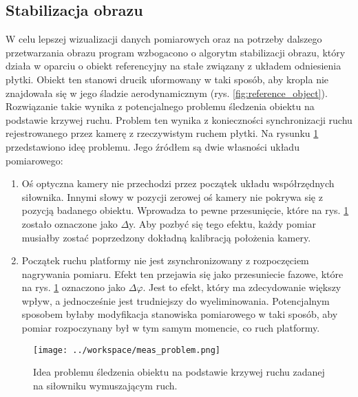 \documentclass[a4paper,11pt,twoside,openright]{article} %
\begin{document}
\vspace{10mm}
\subsection{Stabilizacja obrazu}
\noindent W celu lepszej wizualizacji danych pomiarowych oraz na potrzeby dalszego przetwarzania obrazu program wzbogacono o algorytm stabilizacji obrazu, który działa w oparciu o obiekt referencyjny na stałe związany z układem odniesienia płytki. Obiekt ten stanowi drucik uformowany w taki sposób, aby kropla nie znajdowała się w jego śladzie aerodynamicznym (rys. \ref{fig:reference_object}). Rozwiązanie takie wynika z potencjalnego problemu śledzenia obiektu na podstawie krzywej ruchu. Problem ten wynika z konieczności synchronizacji ruchu rejestrowanego przez kamerę z rzeczywistym ruchem płytki. Na rysunku \ref{fig:meas_problem} przedstawiono ideę problemu. Jego źródłem są dwie własności układu pomiarowego:
\begin{enumerate}
	\item Oś optyczna kamery nie przechodzi przez początek układu współrzędnych siłownika. Innymi słowy w pozycji zerowej oś kamery nie pokrywa się z pozycją badanego obiektu. Wprowadza to pewne przesunięcie, które na rys. \ref{fig:meas_problem} zostało oznaczone jako $\Delta$y. Aby pozbyć się tego efektu, każdy pomiar musiałby zostać poprzedzony dokładną kalibracją położenia kamery.
	\item Początek ruchu platformy nie jest zsynchronizowany z rozpoczęciem nagrywania pomiaru. Efekt ten przejawia się jako przesuniecie fazowe, które na rys. \ref{fig:meas_problem} oznaczono jako $\Delta \varphi$. Jest to efekt, który ma zdecydowanie większy wpływ, a jednocześnie jest trudniejszy do wyeliminowania. Potencjalnym sposobem byłaby modyfikacja stanowiska pomiarowego w taki sposób, aby pomiar rozpoczynany był w tym samym  momencie, co ruch platformy.
\end{enumerate}
\newpage

\captionsetup{skip=0pt}
\begin{figure}[!h]
\captionsetup{justification=centering}
\begin{center}
\texttt{[image: ../workspace/meas\_problem.png]} 
\end{center}
\caption{Idea problemu śledzenia obiektu na podstawie krzywej ruchu zadanej \\na siłowniku wymuszającym ruch.}
\label{fig:meas_problem}
\end{figure} 
\end{document}
